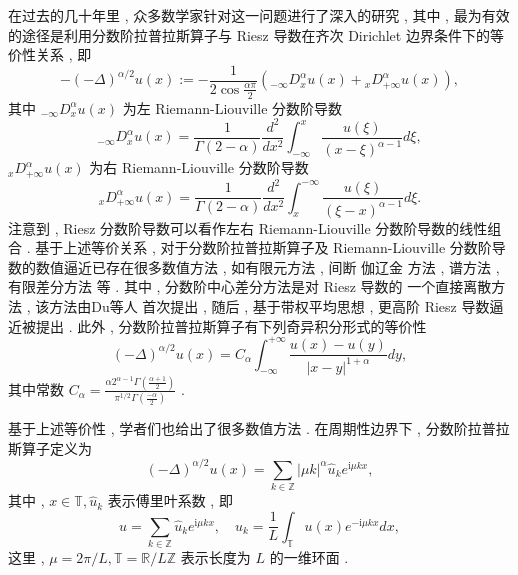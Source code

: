 在过去的几十年里 , 众多数学家针对这一问题进行了深入的研究 , 其中 , 最为有效的途径是利用分数阶拉普拉斯算子与 Riesz 导数在齐次 Dirichlet 边界条件下的等价性关系 \cite{yangNumericalMethodsFractional2010,demengelFunctionalSpacesTheory2012} , 即
\begin{equation}
-(-\Delta)^{\alpha / 2} u(x):=-\frac{1}{2 \cos \frac{\alpha \pi}{2}}\left({ }_{-\infty }D_x^\alpha u(x)+{ }_x D_{+\infty}^\alpha u(x)\right) , 
\end{equation}
其中 ${ }_{-\infty} D_x^\alpha u(x)$ 为左 Riemann-Liouville 分数阶导数
\begin{equation}
{ }_{-\infty} D_x^\alpha u(x)=\frac{1}{\Gamma(2-\alpha)} \frac{d^2}{d x^2} \int_{-\infty}^x \frac{u(\xi)}{(x-\xi)^{\alpha-1}} d \xi , 
\end{equation}
${ }_x D_{+\infty}^\alpha u(x)$ 为右 Riemann-Liouville 分数阶导数
\begin{equation}
{ }_x D_{+\infty}^\alpha u(x)=\frac{1}{\Gamma(2-\alpha)} \frac{d^2}{d x^2} \int^{-\infty}_x \frac{u(\xi)}{(\xi-x)^{\alpha-1}} d \xi  . 
\end{equation}
注意到 , Riesz 分数阶导数可以看作左右 Riemann-Liouville 分数阶导数的线性组合 . 
基于上述等价关系 , 对于分数阶拉普拉斯算子及 Riemann-Liouville 分数阶导数的数值逼近已存在很多数值方法 , 如有限元方法 \cite{dengFiniteElementMethod2009,ervinNumericalApproximationTime2007} , 间断 伽辽金 方法 \cite{xuDiscontinuousGalerkinMethod2014} , 谱方法 \cite{zayernouriFractionalSpectralCollocation2014,zengCrankNicolsonADI2014} , 有限差分方法 \cite{chenFourthOrderAccurate2014,meerschaertFiniteDifferenceApproximations2004} 等 . 
其中 , 分数阶中心差分方法是对 Riesz 导数的 一个直接离散方法 , 该方法由Du等人 \cite{duAnalysisApproximationNonlocal2012} 首次提出 , 随后 , 基于带权平均思想 , 更高阶 Riesz 导数逼近被提出 \cite{dingHighorderAlgorithmsRiesz2015,zhangFourthOrderCompactDifference2014} . 
此外 , 分数阶拉普拉斯算子有下列奇异积分形式的等价性 \cite{duAnalysisApproximationNonlocal2012}
\begin{equation}
(-\Delta)^{\alpha / 2} u(x)=C_\alpha \int_{-\infty}^{+\infty} \frac{u(x)-u(y)}{|x-y|^{1+\alpha}} d y , 
\end{equation}
其中常数 $C_\alpha=\frac{\alpha 2^{\alpha-1} \Gamma\left(\frac{\alpha+1}{2}\right)}{\pi^{1 / 2} \Gamma\left(\frac{-\alpha}{2}\right)}$ . 

基于上述等价性 , 学者们也给出了很多数值方法\cite{gaoMeanExitTime2014,huangNumericalMethodsFractional2014} . 在周期性边界下 , 分数阶拉普拉斯算子定义为 \cite{guoFractionalPartialDifferential2015}
\begin{equation}
(-\Delta)^{\alpha / 2} u(x)=\sum_{k \in \mathbb{Z}}|\mu k|^\alpha \hat{u}_k e^{\mathrm{i} \mu k x} , 
\end{equation}
其中 , $x \in \mathbb{T} , \hat{u}_k$ 表示傅里叶系数 , 即
\begin{equation}
u=\sum_{k \in \mathbb{Z}} \hat{u}_k e^{\mathrm{i} \mu k x} , \quad \hat{u}_k=\frac{1}{L} \int_{\mathbb{T}} u(x) e^{-\mathrm{i} \mu k x} d x , 
\end{equation}
这里 , $\mu=2 \pi / L , \mathbb{T}=\mathbb{R} / L \mathbb{Z}$ 表示长度为 $L$ 的一维环面 . 

